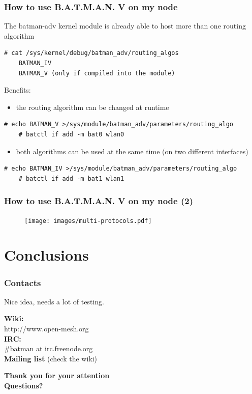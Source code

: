 \documentclass[slidestop]{beamer}
\begin{document}
\begin{frame}[c,fragile]
	\frametitle{How to use B.A.T.M.A.N. V on my node}
	The batman-adv kernel module is already able to host more than one
	routing algorithm
	\pause
	\begin{lstlisting}[basicstyle=\scriptsize]
	# cat /sys/kernel/debug/batman_adv/routing_algos
	BATMAN_IV
	BATMAN_V (only if compiled into the module)
	\end{lstlisting}
	\pause
	Benefits:
	\begin{itemize}
		\item the routing algorithm can be changed at runtime
	\end{itemize}
	\pause
	\begin{lstlisting}[basicstyle=\scriptsize]
	# echo BATMAN_V >/sys/module/batman_adv/parameters/routing_algo
	# batctl if add -m bat0 wlan0
	\end{lstlisting}
	\pause
	\begin{itemize}
		\item both algorithms can be used at the same time (on two
			different interfaces)
	\end{itemize}
	\begin{lstlisting}[basicstyle=\scriptsize]
	# echo BATMAN_IV >/sys/module/batman_adv/parameters/routing_algo
	# batctl if add -m bat1 wlan1
	\end{lstlisting}

\end{frame}

\begin{frame}[c]
	\frametitle{How to use B.A.T.M.A.N. V on my node (2)}
	\begin{figure}
		\centering
		\texttt{[image: images/multi-protocols.pdf]}
	\end{figure}
\end{frame}

\section{Conclusions}
\begin{frame}
	\frametitle{Contacts}
	Nice idea, needs a lot of testing.

	\textbf{Wiki:}\\
	http://www.open-mesh.org\\
	\textbf{IRC:}\\
	\#batman at irc.freenode.org\\
	\textbf{Mailing list} (check the wiki)
\end{frame}

\begin{frame}[c]
	\begin{center}
	\Large{\textbf{Thank you for your attention\\[1cm]
	Questions?}}
	\end{center}
\end{frame}
\end{document}
